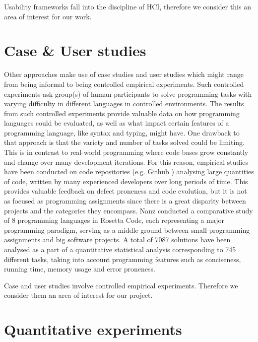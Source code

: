 Usability frameworks fall into the discipline of HCI, therefore we consider this an area of interest for our work.		

\section{Case \& User studies}
Other approaches make use of case studies and user studies which might range from being informal to being controlled empirical experiments. Such controlled experiments \cite{DynamicTypeSystems}\cite{MulticoreLangs}\cite{EmpiricalComparison} \cite{Empiricalinvestigation} ask group(s) of human participants to solve programming tasks with varying difficulty in different languages in controlled environments. The results from such controlled experiments provide valuable data on how programming languages could be evaluated, as well as what impact certain features of a programming language, like syntax and typing, might have. One drawback to that approach is that the variety and number of tasks solved could be limiting. This is in contrast to real-world programming where code bases grow constantly and change over many development iterations. For this reason, empirical studies have been conducted on code repositories (e.g. Github \cite{GitHub}) analysing large quantities of code, written by many experienced developers over long periods of time. This provides valuable feedback on defect proneness and code evolution, but it is not as focused as programming assignments since there is a great disparity between projects and the categories they encompass. Nanz \cite{RosettaCode} conducted a comparative study of 8 programming languages in Rosetta Code, each representing a major programming paradigm, serving as a middle ground between small programming assignments and big software projects. A total of 7087 solutions have been analysed as a part of a quantitative statistical analysis corresponding to 745 different tasks, taking into account programming features such as conciseness, running time, memory usage and error proneness.

Case and user studies involve controlled empirical experiments. Therefore we consider them an area of interest for our project.

\section{Quantitative experiments }

